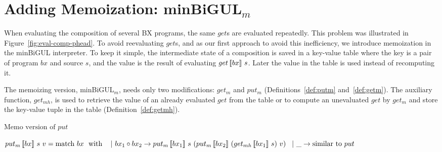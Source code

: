 \section{Adding Memoization: minBiGUL$_m$} \label{sect:minbigulm}

When evaluating the composition of several BX programs, 
the same $get$s are evaluated repeatedly.
This problem was illustrated in Figure~\ref{fig:eval-comp-phead}. To avoid reevaluating $get$s, and as our first approach to avoid this inefficiency, we introduce memoization in the minBiGUL interpreter.
To keep it simple, the intermediate state of a composition is saved in a key-value table where the key is a pair of program $bx$ and source $s$, and the value is the result of evaluating $get \, [\![bx]\!] \ s$.
Later the value in the table is used instead of recomputing it. 

The memoizing version, minBiGUL$_m$, needs only two modifications: $get_m$ and $put_m$ (Definitions~\ref{def:putm} and~\ref{def:getm}). The auxiliary function, $get_{mh}$, is used to retrieve the value of an already evaluated $get$ from the table or to compute an unevaluated $get$ by $get_m$ and store the key-value tuple in the table (Definition~\ref{def:getmh}).

\begin{definition} \label{def:putm} $\text{Memo version of } put$

    \noindent $\putm{bx}{s}{v} = \match{bx}\\
        \tab \vert \ bx_1 \circ bx_2 \to \putm{bx_1}{s}{(\putm{bx_2}{(\getmh{bx_1}{s})}{v})} \\
        \tab \vert \ \_ \to \text{similar to } put$
\end{definition}

